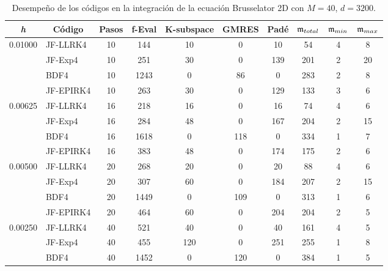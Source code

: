 \begin{table}[htb]
	\caption{Desempeño de los códigos en la integración de la ecuación Brusselator 2D con $M=40$, $d=3200$.}
	\centering
	\begin{adjustbox}{width=0.9\columnwidth,center}
		\begin{tabular}{cccccccccc}
			\hline
			\textit{h} & Código & Pasos & f-Eval & K-subspace & GMRES & Padé & $\mathfrak{m}_{total}$ & $\mf%
			_{min}$ & $\mathfrak{m}_{max}$ \\ \hline
			\multicolumn{1}{l}{0.01000} & \multicolumn{1}{l}{JF-LLRK4} & 10 & 144 & 10
			& 0 & 10 & 54 & 4 & 8 \\
			\multicolumn{1}{l}{} & \multicolumn{1}{l}{JF-Exp4} & 10 & 251 & 30 & 0 & 139
			& 201 & 2 & 20 \\
			\multicolumn{1}{l}{} & \multicolumn{1}{l}{BDF4} & 10 & 1243 & 0 & 86 & 0 &
			283 & 2 & 8 \\
			\multicolumn{1}{l}{} & \multicolumn{1}{l}{JF-EPIRK4} & 10 & 263 & 30 & 0 &
			129 & 133 & 3 & 6 \\
			\multicolumn{1}{l}{0.00625} & \multicolumn{1}{l}{JF-LLRK4} & 16 & 218 & 16
			& 0 & 16 & 74 & 4 & 6 \\
			\multicolumn{1}{l}{} & \multicolumn{1}{l}{JF-Exp4} & 16 & 284 & 48 & 0 & 167
			& 204 & 2 & 15 \\
			\multicolumn{1}{l}{} & \multicolumn{1}{l}{BDF4} & 16 & 1618 & 0 & 118 & 0 &
			334 & 1 & 7 \\
			\multicolumn{1}{l}{} & \multicolumn{1}{l}{JF-EPIRK4} & 16 & 383 & 48 & 0 &
			174 & 175 & 2 & 6 \\
			\multicolumn{1}{l}{0.00500} & \multicolumn{1}{l}{JF-LLRK4} & 20 & 268 & 20 &
			0 & 20 & 88 & 4 & 6 \\
			\multicolumn{1}{l}{} & \multicolumn{1}{l}{JF-Exp4} & 20 & 307 & 60 & 0 & 184
			& 207 & 2 & 15 \\
			\multicolumn{1}{l}{} & \multicolumn{1}{l}{BDF4} & 20 & 1449 & 0 & 109 & 0 &
			313 & 1 & 6 \\
			\multicolumn{1}{l}{} & \multicolumn{1}{l}{JF-EPIRK4} & 20 & 464 & 60 & 0 &
			204 & 204 & 2 & 5 \\
			\multicolumn{1}{l}{0.00250} & \multicolumn{1}{l}{JF-LLRK4} & 40 & 521 & 40 &
			0 & 40 & 161 & 4 & 5 \\
			\multicolumn{1}{l}{} & \multicolumn{1}{l}{JF-Exp4} & 40 & 455 & 120 & 0 & 251
			& 255 & 1 & 8 \\
			\multicolumn{1}{l}{} & \multicolumn{1}{l}{BDF4} & 40 & 1452 & 0 & 120 & 0 &
			384 & 1 & 5 \\

\end{tabular}
\end{adjustbox}
\end{table}
